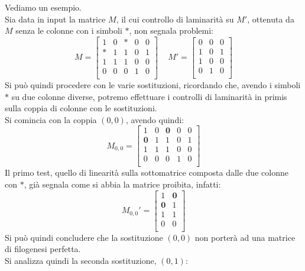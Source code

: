 \documentclass[a4paper,12pt, oneside]{book}
\begin{document}
\begin{esempio}
  Vediamo un esempio.\\
  Sia data in input la matrice $M$, il cui controllo di laminarità su $M'$,
  ottenuta da $M$ senza le colonne con i simboli $*$, non segnala
  problemi: 
  \[
    M=\left[
      \begin{matrix}
        1 & 0 & * & 0 & 0\\
        * & 1 & 1 & 0 & 1\\
        1 & 1 & 1 & 0 & 0\\
        0 & 0 & 0 & 1 & 0\\
      \end{matrix}
    \right]\,\,\,\,\,\,\,M'=\left[
      \begin{matrix}
        0 & 0 & 0\\
        1 & 0 & 1\\
        1 & 0 & 0\\
        0 & 1 & 0\\
      \end{matrix}
    \right]
  \]
  Si può quindi procedere con le varie sostituzioni, ricordando che, avendo i
  simboli $*$ su due colonne diverse, potremo effettuare i controlli di
  laminarità in primis sulla coppia di colonne con le sostituzioni.\\
  Si comincia con la coppia $(0,0)$, avendo quindi:
  \[
    M_{0,0}=\left[
      \begin{matrix}
        1 & 0 & \mathbf{0} & 0 & 0\\
        \mathbf{0} & 1 & 1 & 0 & 1\\
        1 & 1 & 1 & 0 & 0\\
        0 & 0 & 0 & 1 & 0\\
      \end{matrix}
    \right]
  \]
  Il primo test, quello di linearità sulla sottomatrice composta dalle due
  colonne con $*$, già segnala come si abbia la matrice proibita, infatti:
  \[
    M_{0,0}'=\left[
      \begin{matrix}
        1 & \mathbf{0} \\
        \mathbf{0} & 1\\
        1 & 1 \\
        0 & 0 \\
      \end{matrix}
    \right]
  \]
  Si può quindi concludere che la sostituzione $(0,0)$ non porterà ad una
  matrice di filogenesi perfetta.\\
  Si analizza quindi la seconda sostituzione, $(0,1)$:

\end{esempio}
\end{document}
